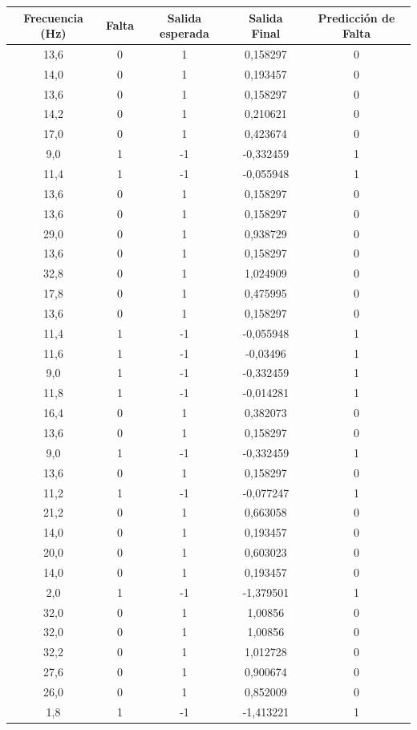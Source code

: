 \documentclass[a0paper,portrait]{baposter}
\begin{document}
\begin{poster}
{\begin{center}
\begin{tabular}{ccccc}
\toprule
Frecuencia (Hz) & Falta &Salida esperada &Salida Final & Predicción de Falta \\
\midrule
13,6 & 0 & 1 & 0,158297 & 0 \\
14,0 & 0 & 1 & 0,193457 & 0 \\
13,6 & 0 & 1 & 0,158297 & 0 \\
14,2 & 0 & 1 & 0,210621 & 0 \\
17,0 & 0 & 1 & 0,423674 & 0 \\
9,0 & 1 & -1 & -0,332459 & 1 \\
11,4 & 1 & -1 & -0,055948 & 1 \\
13,6 & 0 & 1 & 0,158297 & 0 \\
13,6 & 0 & 1 & 0,158297 & 0 \\
29,0 & 0 & 1 & 0,938729 & 0 \\
13,6 & 0 & 1 & 0,158297 & 0 \\
32,8 & 0 & 1 & 1,024909 & 0 \\
17,8 & 0 & 1 & 0,475995 & 0 \\
13,6 & 0 & 1 & 0,158297 & 0 \\
11,4 & 1 & -1 & -0,055948 & 1 \\
11,6 & 1 & -1 & -0,03496 & 1 \\
9,0 & 1 & -1 & -0,332459 & 1 \\
11,8 & 1 & -1 & -0,014281 & 1 \\
16,4 & 0 & 1 & 0,382073 & 0 \\
13,6 & 0 & 1 & 0,158297 & 0 \\
9,0 & 1 & -1 & -0,332459 & 1 \\
13,6 & 0 & 1 & 0,158297 & 0 \\
11,2 & 1 & -1 & -0,077247 & 1 \\
21,2 & 0 & 1 & 0,663058 & 0 \\
14,0 & 0 & 1 & 0,193457 & 0 \\
20,0 & 0 & 1 & 0,603023 & 0 \\
14,0 & 0 & 1 & 0,193457 & 0 \\
2,0 & 1 & -1 & -1,379501 & 1 \\
32,0 & 0 & 1 & 1,00856 & 0 \\
32,0 & 0 & 1 & 1,00856 & 0 \\
32,2 & 0 & 1 & 1,012728 & 0 \\
27,6 & 0 & 1 & 0,900674 & 0 \\
26,0 & 0 & 1 & 0,852009 & 0 \\
1,8 & 1 & -1 & -1,413221 & 1 \\
\bottomrule
\end{tabular}
\end{center}

}
\end{poster}
\end{document}
